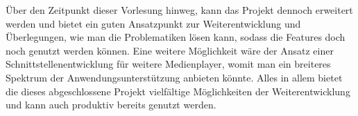 \documentclass[a4paper,12pt]{article}
\begin{document}
Über den Zeitpunkt dieser Vorlesung hinweg, kann das Projekt dennoch erweitert werden und bietet ein guten Ansatzpunkt zur Weiterentwicklung und Überlegungen, wie man die Problematiken lösen kann, sodass die Features doch noch genutzt werden können. Eine weitere Möglichkeit wäre der Ansatz einer Schnittstellenentwicklung für weitere Medienplayer, womit man ein breiteres Spektrum der Anwendungsunterstützung anbieten könnte. Alles in allem bietet die dieses abgeschlossene Projekt vielfältige Möglichkeiten der Weiterentwicklung und kann auch produktiv bereits genutzt werden. 
\newpage
{}
\nocite{*}
\printbibliography

\newpage
{}
\listoffigures

\listoftables

\renewcommand{\lstlistlistingname}{Quellcodeverzeichnis}
\lstlistoflistings
\end{document}
